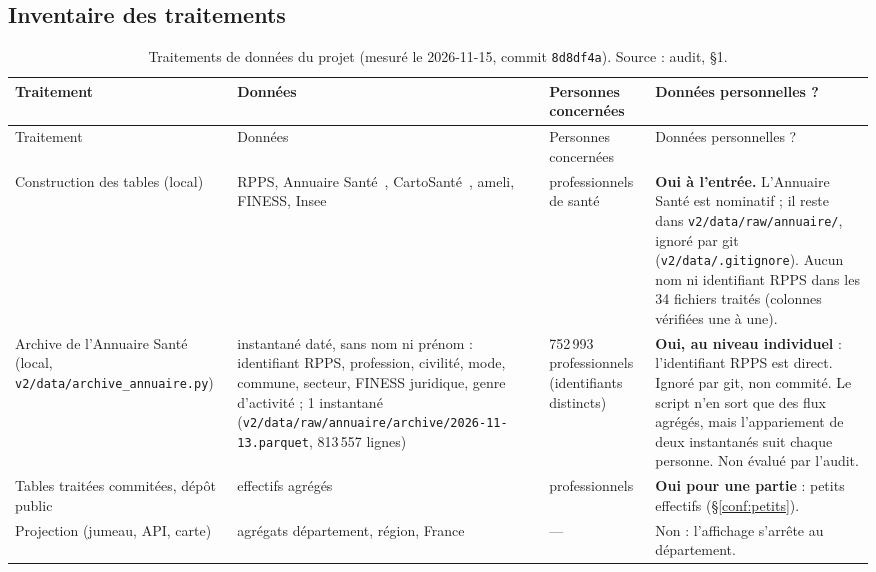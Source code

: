 \subsection{Inventaire des traitements}\label{conf:inventaire}

\begin{small}
\begin{longtable}{@{}p{}p{}p{}p{}@{}}
\caption{Traitements de données du projet (mesuré le 2026-11-15, commit \texttt{8d8df4a}). Source : audit, §1.}\label{conf:tab-inventaire}\\
\toprule Traitement & Données & Personnes concernées & Données personnelles ? \\ \midrule\endfirsthead
\toprule Traitement & Données & Personnes concernées & Données personnelles ? \\ \midrule\endhead
\bottomrule\endfoot
Construction des tables (local) & RPPS, Annuaire Santé~\citep{e-ans2026annuaire}, CartoSanté~\citep{e-cartosante2026}, ameli, FINESS, Insee & professionnels de santé & \textbf{Oui à l'entrée.} L'Annuaire Santé est nominatif ; il reste dans \texttt{v2/\allowbreak{}data/\allowbreak{}raw/\allowbreak{}annuaire/\allowbreak{}}, ignoré par git (\texttt{v2/\allowbreak{}data/\allowbreak{}.gitignore}). Aucun nom ni identifiant RPPS dans les 34\mesure{} fichiers traités (colonnes vérifiées une à une). \\
Archive de l'Annuaire Santé (local, \texttt{v2/\allowbreak{}data/\allowbreak{}archive\_\allowbreak{}annuaire.py}) & instantané daté, sans nom ni prénom : identifiant RPPS, profession, civilité, mode, commune, secteur, FINESS juridique, genre d'activité ; 1\mesure{} instantané (\texttt{v2/\allowbreak{}data/\allowbreak{}raw/\allowbreak{}annuaire/\allowbreak{}archive/\allowbreak{}2026-\allowbreak{}11-\allowbreak{}13.parquet}, 813\,557\mesure{} lignes) & 752\,993\mesure{} professionnels (identifiants distincts) & \textbf{Oui, au niveau individuel} : l'identifiant RPPS est direct. Ignoré par git, non commité. Le script n'en sort que des flux agrégés, mais l'appariement de deux instantanés suit chaque personne. Non évalué par l'audit. \\
Tables traitées commitées, dépôt public & effectifs agrégés & professionnels & \textbf{Oui pour une partie} : petits effectifs (§\ref{conf:petits}). \\
Projection (jumeau, API, carte) & agrégats département, région, France & --- & Non : l'affichage s'arrête au département. \\

\end{longtable}
\end{small}
